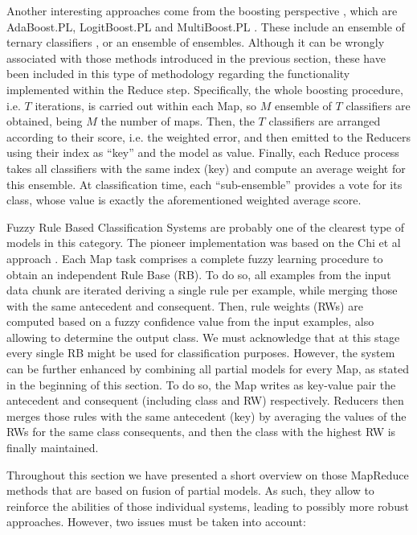 \documentclass[3p,review]{elsarticle}
\begin{document}
Another interesting approaches come from the boosting perspective \cite{schapire99brief}, which are AdaBoost.PL, LogitBoost.PL and MultiBoost.PL \cite{Palit12-Boost}. These include an ensemble of ternary classifiers \cite{schapire99confidence}, or an ensemble of ensembles. Although it can be wrongly associated with those methods introduced in the previous section, these have been included in this type of methodology regarding the functionality implemented within the Reduce step. Specifically, the whole boosting procedure, i.e. $T$ iterations, is carried out within each Map, so $M$ ensemble of $T$ classifiers are obtained, being $M$ the number of maps. Then, the $T$ classifiers are arranged according to their score, i.e. the weighted error, and then emitted to the Reducers using their index as ``key'' and the model as value. Finally, each Reduce process takes all classifiers with the same index (key) and compute an average weight for this ensemble. At classification time, each ``sub-ensemble'' provides a vote for its class, whose value is exactly the aforementioned weighted average score.  

Fuzzy Rule Based Classification Systems \cite{Fer16_fuzzyBD} are probably one of the clearest type of models in this category. The pioneer implementation was based on the Chi et al approach \cite{RioLBH15-Fuzzy}. Each Map task comprises a complete fuzzy learning procedure to obtain an independent Rule Base (RB). To do so, all examples from the input data chunk are iterated deriving a single rule per example, while merging those with the same antecedent and consequent. Then, rule weights (RWs) are computed based on a fuzzy confidence value from the input examples, also allowing to determine the output class. We must acknowledge that at this stage every single RB might be used for classification purposes. However, the system can be further enhanced by combining all partial models for every Map, as stated in the beginning of this section. To do so, the Map writes as key-value pair the antecedent and consequent (including class and RW) respectively. Reducers then merges those rules with the same antecedent (key) by averaging the values of the RWs for the same class consequents, and then the class with the highest RW is finally maintained. 


Throughout this section we have presented a short overview on those MapReduce methods that are based on fusion of partial models. As such, they allow to reinforce the abilities of those individual systems, leading to possibly more robust approaches. However, two issues must be taken into account:
\end{document}
